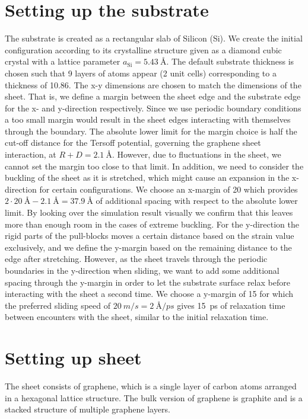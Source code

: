 \section{Setting up the substrate}\label{sec:substrate}
The substrate is created as a rectangular slab of Silicon (Si). We create the
initial configuration according to its crystalline structure given as a diamond
cubic crystal with a lattice parameter $a_{\text{Si}} = \SI{5.43}{\text{Å}}$.
The default substrate thickness is chosen such that 9 layers of atoms appear (2
unit cells) corresponding to a thickness of \SI{10.86}{}. The x-y
dimensions are chosen to match the dimensions of the sheet. That is, we define a
margin between the sheet edge and the substrate edge for the x- and y-direction
respectively. Since we use periodic boundary conditions a too small margin would
result in the sheet edges interacting with themselves through the boundary. The
absolute lower limit for the margin choice is half the cut-off distance for
the Tersoff potential, governing the graphene sheet interaction, at $R + D =
\SI{2.1}{\text{Å}}$. However, due to fluctuations in the sheet, we cannot set the margin too
close to that limit. In addition, we need to consider the buckling of the sheet as it is stretched, which might cause an expansion in the x-direction for certain configurations. We choose an x-margin of \SI{20}{} which provides $2\cdot
\SI{20}{\text{Å}} - \SI{2.1}{\text{Å}} = \SI{37.9}{\text{Å}}$ of additional
spacing with respect to the absolute lower limit. By looking over the simulation
result visually we confirm that this leaves more than enough room in the cases
of extreme buckling. For the y-direction the rigid parts of the pull-blocks
moves a certain distance based on the strain value exclusively, and we define
the y-margin based on the remaining distance to the edge after stretching.
However, as the sheet travels through the periodic boundaries in the y-direction
when sliding, we want to add some additional spacing through the y-margin in
order to let the substrate surface relax before interacting with the sheet a
second time. We choose a y-margin of \SI{15}{} for which the preferred sliding speed
of $\SI{20}{m/s} = \SI{2}{\text{Å}/ps}$ gives \SI{15}{ps} of relaxation time
between encounters with the sheet, similar to the initial relaxation time. 


\section{Setting up sheet}
The sheet consists of graphene, which is a single layer of carbon atoms arranged in a hexagonal lattice structure. The bulk version of graphene is graphite and is a stacked structure of multiple graphene layers. 

